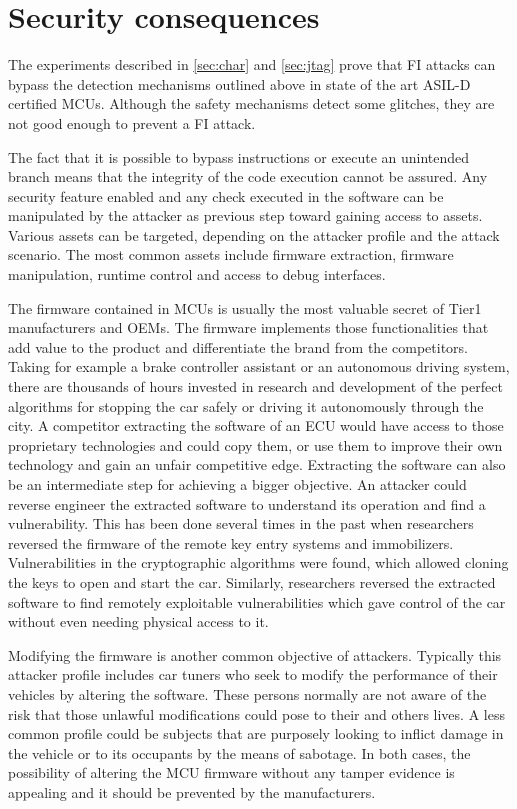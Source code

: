 \documentclass[a4paper, 10pt]{article}
\begin{document}
\section{Security consequences}

The experiments described in \autoref{sec:char} and \autoref{sec:jtag} prove that FI attacks can bypass the detection mechanisms outlined above in state of the art ASIL-D certified MCUs. Although the safety mechanisms detect some glitches, they are not good enough to prevent a FI attack.

The fact that it is possible to bypass instructions or execute an unintended branch means that the integrity of the code execution cannot be assured. Any security feature enabled and any check executed in the software can be manipulated by the attacker as previous step toward gaining access to assets. Various assets can be targeted, depending on the attacker profile and the attack scenario. The most common assets include firmware extraction, firmware manipulation, runtime control and access to debug interfaces.

The firmware contained in MCUs is usually the most valuable secret of Tier1 manufacturers and OEMs. The firmware implements those functionalities that add value to the product and differentiate the brand from the competitors. Taking for example a brake controller assistant or an autonomous driving system, there are thousands of hours invested in research and development of the perfect algorithms for stopping the car safely or driving it autonomously through the city. A competitor extracting the software of an ECU would have access to those proprietary technologies and could copy them, or use them to improve their own technology and gain an unfair competitive edge. Extracting the software can also be an intermediate step for achieving a bigger objective. An attacker could reverse engineer the extracted software to understand its operation and find a vulnerability. This has been done several times in the past when researchers reversed the firmware of the remote key entry systems and immobilizers. Vulnerabilities in the cryptographic algorithms were found, which allowed cloning the keys to open and start the car. Similarly, researchers reversed the extracted software to find remotely exploitable vulnerabilities which gave control of the car without even needing physical access to it.

Modifying the firmware is another common objective of attackers. Typically this attacker profile includes car tuners who seek to modify the performance of their vehicles by altering the software. These persons normally are not aware of the risk that those unlawful modifications could pose to their and others lives. A less common profile could be subjects that are purposely looking to inflict damage in the vehicle or to its occupants by the means of sabotage. In both cases, the possibility of altering the MCU firmware without any tamper evidence is appealing and it should be prevented by the manufacturers.
\end{document}
